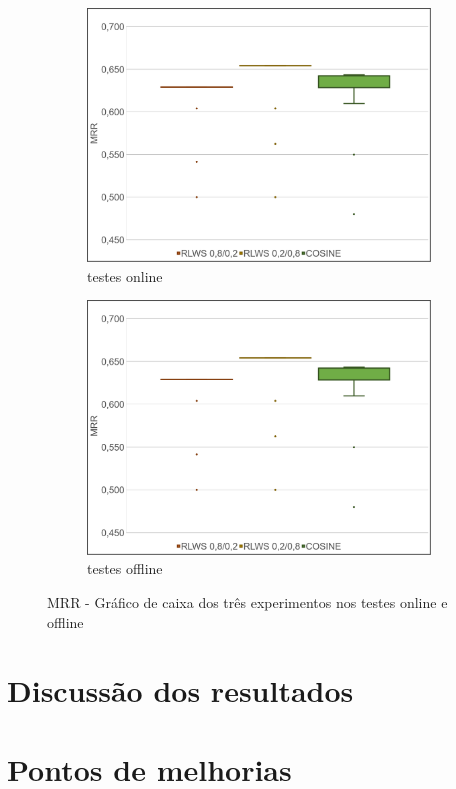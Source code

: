 \begin{figure}
    \begin{subfigure}{.5\textwidth}
        \centering
        \includegraphics[width=.8\linewidth]{imagens/mrr_box_plot.jpg}
        \caption{testes online}
        \label{fig:mrr_box_plot_a}
    \end{subfigure}%
    \begin{subfigure}{.5\textwidth}
        \centering
        \includegraphics[width=.8\linewidth]{imagens/mrr_box_plot.jpg}
        \caption{testes offline}
        \label{fig:mrr_box_plot_b}
    \end{subfigure}
    \caption{MRR - Gráfico de caixa dos três experimentos nos testes online e offline}
    \label{fig:mrr_box_plot}
\end{figure}

\section{Discussão dos resultados}


\section{Pontos de melhorias}

